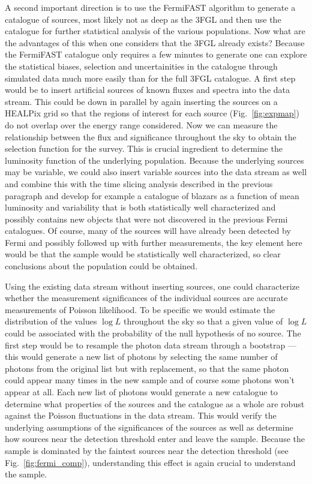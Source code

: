 \documentclass[useAMS,usenatbib]{mn2e}
\begin{document}
A second important direction is to use the FermiFAST algorithm to
generate a catalogue of sources, most likely not as deep as the 3FGL
and then use the catalogue for further statistical analysis of the
various populations.  Now what are the advantages of this when one
considers that the 3FGL already exists?  Because the FermiFAST
catalogue only requires a few minutes to generate one can explore the
statistical biases, selection and uncertainities in the catalogue
through simulated data much more easily than for the full 3FGL
catalogue.  A first step would be to insert artificial sources of
known fluxes and spectra into the data stream.  This could be down in
parallel by again inserting the sources on a HEALPix grid so that the
regions of interest for each source (Fig.~\ref{fig:expmap}) do not
overlap over the energy range considered.  Now we can measure the
relationship between the flux and significance throughout the sky to
obtain the selection function for the survey.  This is crucial
ingredient to determine the luminosity function of the underlying
population.  Because the underlying sources may be variable, we could
also insert variable sources into the data stream as well and combine
this with the time slicing analysis described in the previous
paragraph and develop for example a catalogue of blazars as a function
of mean luminosity and variability that is both statistically well
characterized and possibly contains new objects that were not
discovered in the previous Fermi catalogues.  Of course, many of the sources
will have already been detected by Fermi and possibly followed up
with further measurements, the key element here would be that the sample
would be statistically well characterized, so clear conclusions about the
population could be obtained.

Using the existing data stream without inserting sources, one could
characterize whether the measurement significances of the individual
sources are accurate measurements of Poisson likelihood.  To be specific
we would estimate the distribution of the values $\log L$ throughout
the sky so that a given value of $\log L$ could be associated with
the probability of the null hypothesis of no source. The
first step would be to resample the photon data stream through a
bootstrap --- this would generate a new list of photons by selecting
the same number of photons from the original list but with
replacement, so that the same photon could appear many times in the
new sample and of course some photons won't appear at all.  Each new
list of photons would generate a new catalogue to determine what
properties of the sources and the catalogue as a whole are robust
against the Poisson fluctuations in the data stream.  This would
verify the underlying assumptions of the significances of the sources
as well as determine how sources near the detection threshold enter
and leave the sample.  Because the sample is dominated by the faintest
sources near the detection threshold (see Fig.~\ref{fig:fermi_comp}),
understanding this effect is again crucial to understand the sample.
\end{document}

